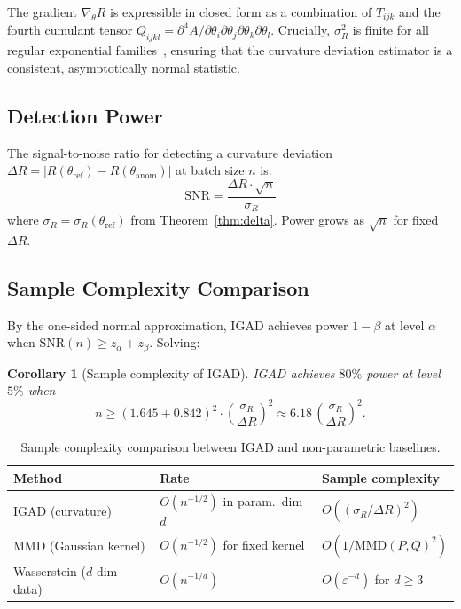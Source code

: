 \documentclass[12pt]{article}
\newtheorem{corollary}[theorem]{Corollary}
\begin{document}
The gradient $\nabla_\theta R$ is expressible in closed form as a combination of
$T_{ijk}$ and the fourth cumulant tensor $Q_{ijkl} = \partial^4 A/\partial\theta_i
\partial\theta_j\partial\theta_k\partial\theta_l$. Crucially, $\sigma^2_R$ is
finite for all regular exponential families~\cite{amari2000}, ensuring that the
curvature deviation estimator is a consistent, asymptotically normal statistic.

\subsection{Detection Power}

The signal-to-noise ratio for detecting a curvature deviation
$\Delta R = |R(\theta_{\mathrm{ref}}) - R(\theta_{\mathrm{anom}})|$ at batch size $n$
is:
\[
  \mathrm{SNR} = \frac{\Delta R \cdot \sqrt{n}}{\sigma_R}
\]
where $\sigma_R = \sigma_R(\theta_{\mathrm{ref}})$ from Theorem~\ref{thm:delta}.
Power grows as $\sqrt{n}$ for fixed $\Delta R$.

\subsection{Sample Complexity Comparison}

By the one-sided normal approximation, IGAD achieves power $1-\beta$ at level
$\alpha$ when $\mathrm{SNR}(n) \geq z_\alpha + z_\beta$. Solving:

\begin{corollary}[Sample complexity of IGAD]
IGAD achieves $80\%$ power at level $5\%$ when
\[
  n \geq (1.645 + 0.842)^2 \cdot \left(\frac{\sigma_R}{\Delta R}\right)^2
    \approx 6.18\,\left(\frac{\sigma_R}{\Delta R}\right)^2.
\]
\end{corollary}

\begin{table}[h]
\centering
\caption{Sample complexity comparison between IGAD and non-parametric baselines.}
\begin{tabular}{lll}
\toprule
Method & Rate & Sample complexity \\
\midrule
IGAD (curvature) & $O(n^{-1/2})$ in param.\ dim $d$ & $O\!\left((\sigma_R/\Delta R)^2\right)$ \\
MMD (Gaussian kernel) & $O(n^{-1/2})$ for fixed kernel & $O(1/\mathrm{MMD}(P,Q)^2)$ \\
Wasserstein ($d$-dim data) & $O(n^{-1/d})$ & $O(\varepsilon^{-d})$ for $d\geq 3$ \\
\bottomrule
\end{tabular}
\end{table}
\end{document}
